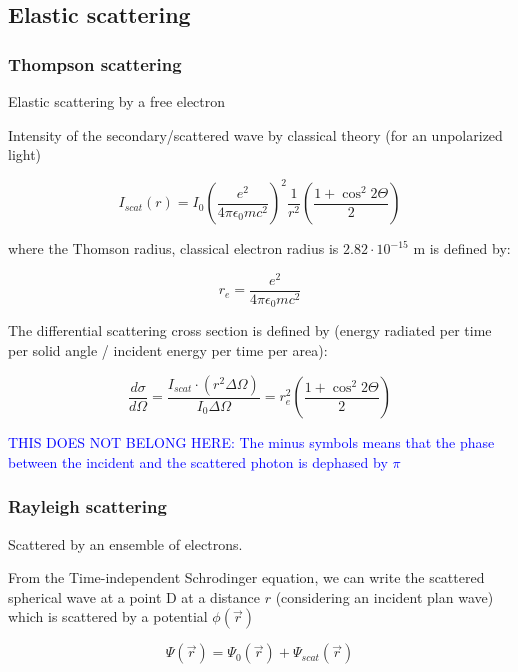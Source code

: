 \subsection{Elastic scattering}

\subsubsection{Thompson scattering}
Elastic scattering by a free electron

Intensity of the secondary/scattered wave by classical theory (for an unpolarized light)

\begin{equation}
        I_{scat}\left( r \right)= I_0 \left( \frac{e^2}{4\pi \epsilon_0 m c^2} \right)^2 \frac{1}{r^2} \left( \frac{1+\cos^2{2\Theta}}{2} \right)
\end{equation}

where the Thomson radius, classical electron radius is $2.82\cdot10^{-15}$ m is defined by:

\begin{equation}
        r_e= \frac{e^2}{4\pi\epsilon_0 m c^2}
\end{equation}

The differential scattering cross section is defined by (energy radiated per time per solid angle / incident energy per time per area):

\begin{equation}
        \label{eq:thomson_cross_section}
        \frac{d\sigma}{d\Omega}= \frac{I_{scat} \cdot \left(r^2 \Delta \Omega \right)}{I_0\Delta \Omega}=r_e^2\left( \frac{1+\cos^2{2\Theta}}{2} \right)
\end{equation}


\textcolor{blue}{THIS DOES NOT BELONG HERE: The minus symbols means that the phase between the incident and the scattered photon is dephased by $\pi$}

\subsubsection{Rayleigh scattering}
Scattered by an ensemble of electrons.

From the Time-independent Schrodinger equation, we can write the scattered spherical wave at a point D at a distance $r$ (considering an incident plan wave) which is scattered by a potential $\phi(\vec{r})$

\begin{equation}
       \Psi\left( \vec{r} \right)= \Psi_0\left( \vec{r} \right) +  \Psi_{scat}\left( \vec{r} \right)
\end{equation}

